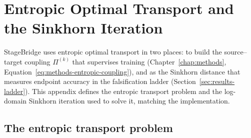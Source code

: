 \appendix 
\makeatletter
{}
\makeatother
\renewcommand{\thechapter}{\Alph{chapter}}

\chapter{Entropic Optimal Transport and the Sinkhorn Iteration} \label{chap:appendix-a}


StageBridge uses entropic optimal transport in two places: to build the source--target coupling
$\Pi^{(k)}$ that supervises training (Chapter~\ref{chap:methods}, Equation~\ref{eq:methods-entropic-coupling}), and as the
Sinkhorn distance that measures endpoint accuracy in the falsification ladder
(Section~\ref{sec:results-ladder}). This appendix defines the entropic transport problem and the log-domain
Sinkhorn iteration used to solve it, matching the implementation.

\section{The entropic transport problem}

